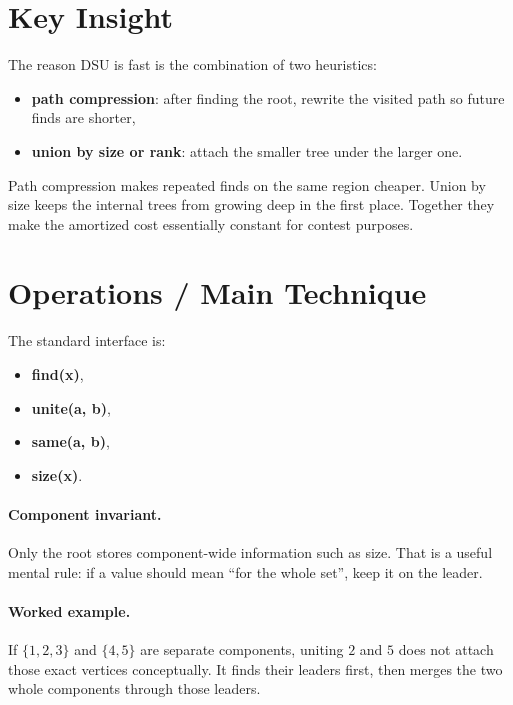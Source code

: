\section*{Key Insight}

The reason DSU is fast is the combination of two heuristics:

\begin{itemize}
  \item \textbf{path compression}: after finding the root, rewrite the visited path so future finds are shorter,
  \item \textbf{union by size or rank}: attach the smaller tree under the larger one.
\end{itemize}

Path compression makes repeated finds on the same region cheaper. Union by size keeps the internal trees from growing
deep in the first place. Together they make the amortized cost essentially constant for contest purposes.

\section*{Operations / Main Technique}

The standard interface is:

\begin{itemize}
  \item \textbf{find(x)},
  \item \textbf{unite(a, b)},
  \item \textbf{same(a, b)},
  \item \textbf{size(x)}.
\end{itemize}

\paragraph{Component invariant.}
Only the root stores component-wide information such as size. That is a useful mental rule: if a value should mean
``for the whole set'', keep it on the leader.

\paragraph{Worked example.}
If \(\{1, 2, 3\}\) and \(\{4, 5\}\) are separate components, uniting \(2\) and \(5\) does not attach those exact
vertices conceptually. It finds their leaders first, then merges the two whole components through those leaders.

